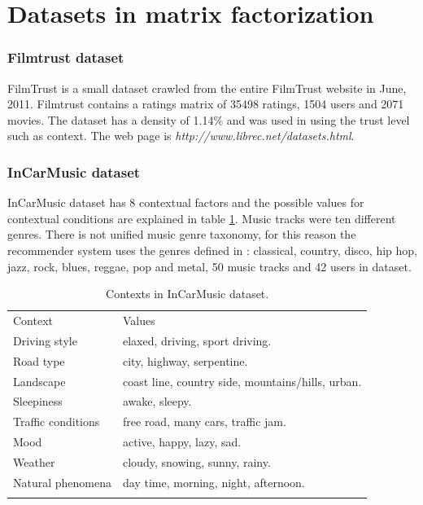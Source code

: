 \section{Datasets in matrix factorization}

\subsubsection{Filmtrust dataset} 

FilmTrust is a small dataset crawled from the entire FilmTrust website
in June, 2011. Filmtrust contains a ratings matrix of 35498 ratings,
1504  users and 2071 movies. The dataset has a density of 1.14\% and
was used in \cite{guo2013novel} using the trust level such as
context. The web page is \textit{http://www.librec.net/datasets.html}.

\subsubsection{InCarMusic dataset}

InCarMusic dataset\cite{baltrunas2011incarmusic} has 8 
contextual factors and the possible values for contextual conditions 
are explained in table \ref{tab:incarmusic}.
Music tracks were ten different genres. There is not unified music
genre taxonomy, for this reason the recommender system uses the genres
defined in \cite{tzanetakis2002musical}: classical, country, disco, 
hip hop,  jazz, rock, blues, reggae, pop and metal, 50 music tracks 
and 42 users in dataset.
\begin{table}
\centering
\small
\captionsetup{font=footnotesize}
\caption{Contexts in InCarMusic dataset.}
\label{tab:incarmusic}   
\begin{tabular}{ll}
\hline\noalign{\smallskip}
Context  			& Values \\
\noalign{\smallskip}\hline\noalign{\smallskip}
Driving style 		&  elaxed, driving, sport driving.   \\
Road type 			&  city, highway, serpentine. \\
Landscape 			& coast line, country side, mountains/hills, urban.\\
Sleepiness 			& awake, sleepy. \\
Traffic conditions 	& free road, many cars, traffic jam. \\
Mood 				& active, happy, lazy, sad. \\
Weather 			& cloudy, snowing, sunny, rainy. \\
Natural phenomena 	& day time, morning, night, afternoon. \\
\noalign{\smallskip}\hline
\end{tabular}
\end{table}


